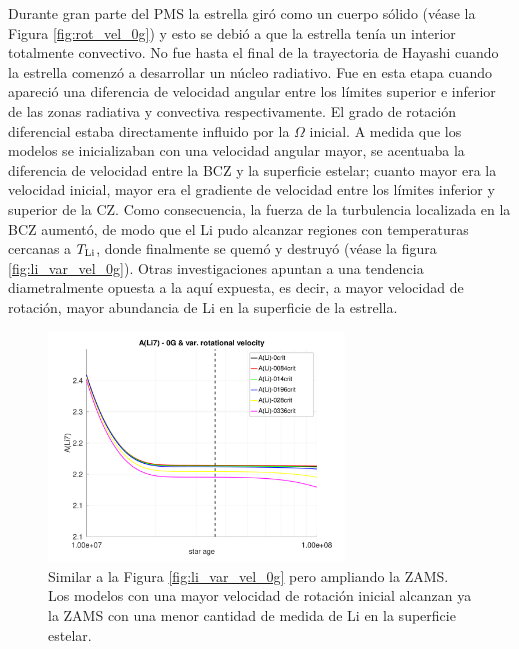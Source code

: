 Durante gran parte del PMS la estrella giró como un cuerpo sólido (véase la Figura \ref{fig:rot_vel_0g}) y esto se debió a que la estrella tenía un interior totalmente convectivo. No fue hasta el final de la trayectoria de Hayashi cuando la estrella comenzó a desarrollar un núcleo radiativo. Fue en esta etapa cuando apareció una diferencia de velocidad angular entre los límites superior e inferior de las zonas radiativa y convectiva respectivamente. El grado de rotación diferencial estaba directamente influido por la $\Omega$ inicial. A medida que los modelos se inicializaban con una velocidad angular mayor, se acentuaba la diferencia de velocidad entre la BCZ y la superficie estelar; cuanto mayor era la velocidad inicial, mayor era el gradiente de velocidad entre los límites inferior y superior de la CZ. Como consecuencia, la fuerza de la turbulencia localizada en la BCZ aumentó, de modo que el Li pudo alcanzar regiones con temperaturas cercanas a $T_{\mathrm{Li}}$, donde finalmente se quemó y destruyó (véase la figura \ref{fig:li_var_vel_0g}). Otras investigaciones \cite{Bouvier2018, Baraffe2017} apuntan a una tendencia diametralmente opuesta a la aquí expuesta, es decir, a mayor velocidad de rotación, mayor abundancia de Li en la superficie de la estrella. \par

\begin{figure}
    \centering
    \includegraphics[width=0.7\textwidth]{img/paper1/li_var_vel_0_0g_z1.pdf}
	\caption {Similar a la Figura \ref{fig:li_var_vel_0g} pero ampliando la ZAMS. Los modelos con una mayor velocidad de rotación inicial alcanzan ya la ZAMS con una menor cantidad de medida de Li en la superficie estelar.}
	\label{fig:li_var_vel_0g_z1}
\end{figure}

